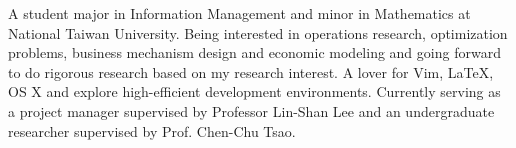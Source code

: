 

\begin{cvparagraph}

A student major in Information Management and minor in Mathematics at National Taiwan University. Being interested in operations research, optimization 
problems, business mechanism design and economic modeling and going forward to do rigorous research based on my research interest. A lover for Vim, 
\LaTeX, OS X and explore high-efficient development environments. Currently serving as a project manager supervised by Professor Lin-Shan Lee and an 
undergraduate researcher supervised by Prof. Chen-Chu Tsao.
\end{cvparagraph}
